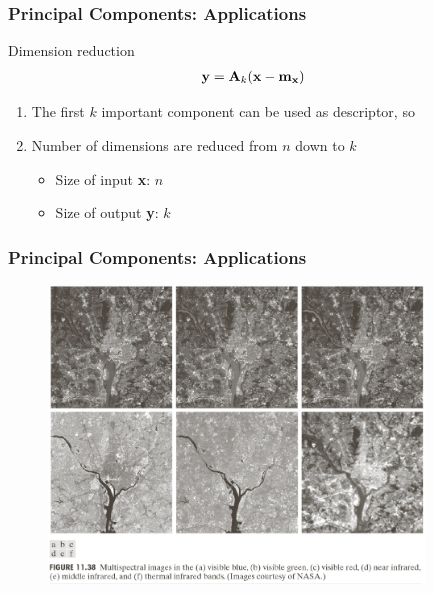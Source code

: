 \documentclass[english,11pt,table,handout]{beamer}
\begin{document}
\frame
{
	\frametitle{Principal Components: Applications}
	\large	
	
	
	\begin{block}{Dimension reduction }
		\begin{equation}
		\nonumber
		\begin{split}
		\text{\textbf{y}} 
		&= \text{\textbf{A}}_k (\text{\textbf{x}} - \text{\textbf{m}}_\text{\textbf{x}})
		\end{split}
		\end{equation}
		
		\begin{enumerate}
			\item The first $k$ important component can be used as descriptor, so
			\item Number of dimensions are reduced from $n$ down to $k$
			\begin{itemize}
				\item Size of input \textbf{x}: $n$
				\item Size of output \textbf{y}: $k$
			\end{itemize}
		\end{enumerate}
	\end{block}
	
}

\frame
{
	\frametitle{Principal Components: Applications}
	\begin{figure}
		\includegraphics[width=10cm]{pca_1.png}
	\end{figure}
}
\end{document}
